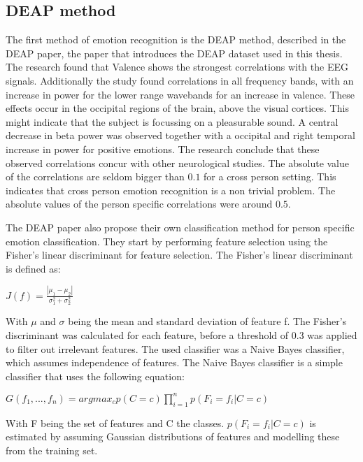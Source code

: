 \subsection{DEAP method}
The first method of emotion recognition is the DEAP method, described in the DEAP paper\citep{DEAP}, the paper that introduces the DEAP dataset used in this thesis. The research found that Valence shows the strongest correlations with the EEG signals. Additionally the study found correlations in all frequency bands, with an increase in power for the lower range wavebands for an increase in valence. These effects occur in the occipital regions of the brain, above the visual cortices. This might indicate that the subject is focussing on a pleasurable sound. A central decrease in beta power was observed together with a occipital and right temporal increase in power for positive emotions. The research conclude that these observed correlations concur with other neurological studies. The absolute value of the correlations are seldom bigger than $0.1$ for a cross person setting. This indicates that cross person emotion recognition is a non trivial problem. The absolute values of the person specific correlations were around $0.5$.

\npar

The DEAP paper also propose their own classification method for person specific emotion classification. They start by performing feature selection using the Fisher's linear discriminant for feature selection. The Fisher's linear discriminant is defined as:

\begin{center}
$J(f) = \frac{|\mu_1 - \mu_2|}{\sigma_1^2 + \sigma_2^2}$ \
\end{center}

With $\mu$ and $\sigma$ being the mean and standard deviation of feature f. The Fisher's discriminant was calculated for each feature, before a threshold of 0.3 was applied to filter out irrelevant features. The used classifier was a Naive Bayes classifier, which assumes independence of features. The Naive Bayes classifier is a simple classifier that uses the following equation:

\begin{center}
$G(f_1, ..., f_n) = argmax_c p(C=c) \prod\limits_{i=1}^n p(F_i=f_i|C=c)$ \\
\end{center}

With F being the set of features and C the classes. $p(F_i=f_i|C=c)$ is estimated by assuming Gaussian distributions of features and modelling these from the training set.

